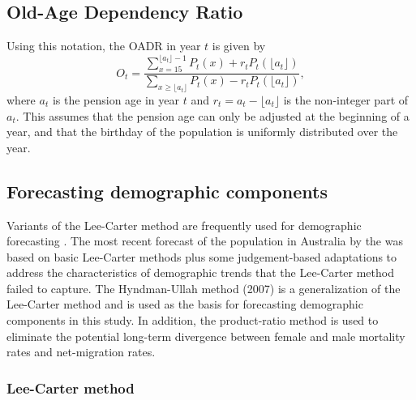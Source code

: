 \documentclass[
  doublespace]{anzsauth}
\begin{document}
\hypertarget{old-age-dependency-ratio}{%
\subsection{Old-Age Dependency Ratio}\label{old-age-dependency-ratio}}

Using this notation, the OADR in year \(t\) is given by
\begin{equation}\label{eq:oadr}
O_t = \frac{\displaystyle\sum_{x=15}^{\lfloor a_t\rfloor-1} P_t(x) + r_t P_t(\lfloor a_t\rfloor)}{\displaystyle\sum_{x\ge \lfloor a_t\rfloor} P_t(x) - r_t P_t(\lfloor a_t\rfloor)},
\end{equation}
where \(a_t\) is the pension age in year \(t\) and \(r_t = a_t - \lfloor a_t \rfloor\) is the non-integer part of \(a_t\). This assumes that the pension age can only be adjusted at the beginning of a year, and that the birthday of the population is uniformly distributed over the year.

\hypertarget{forecasting-demographic-components}{%
\subsection{Forecasting demographic components}\label{forecasting-demographic-components}}

Variants of the Lee-Carter method \citep{LC92} are frequently used for demographic forecasting \citep[see, e.g.,][]{SBH11}. The most recent forecast of the population in Australia by the \citet{PC13} was based on basic Lee-Carter methods plus some judgement-based adaptations to address the characteristics of demographic trends that the Lee-Carter method failed to capture. The Hyndman-Ullah method (2007) is a generalization of the Lee-Carter method and is used as the basis for forecasting demographic components in this study. In addition, the product-ratio method \citep{HBY13} is used to eliminate the potential long-term divergence between female and male mortality rates and net-migration rates.

\hypertarget{lee-carter-method}{%
\subsubsection*{Lee-Carter method}\label{lee-carter-method}}
\end{document}
